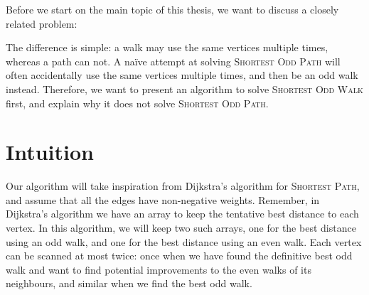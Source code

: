 Before we start on the main topic of this thesis, we want to discuss a closely related problem:

\noindent{}

The difference is simple: a walk may use the same vertices multiple times, whereas a path can not. A naïve attempt at solving \textsc{Shortest Odd Path} will often accidentally use the same vertices multiple times, and then be an odd walk instead. Therefore, we want to present an algorithm to solve \textsc{Shortest Odd Walk} first, and explain why it does not solve \textsc{Shortest Odd Path}.

\section{Intuition}
Our algorithm will take inspiration from Dijkstra's algorithm for \textsc{Shortest Path}, and assume that all the edges have non-negative weights. Remember, in Dijkstra's algorithm we have an array to keep the tentative best distance to each vertex. In this algorithm, we will keep two such arrays, one for the best distance using an odd walk, and one for the best distance using an even walk. Each vertex can be scanned at most twice: once when we have found the definitive best odd walk and want to find potential improvements to the even walks of its neighbours, and similar when we find the best odd walk.

